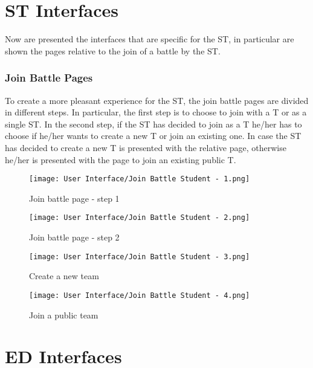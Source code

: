 \newpage

\section*{ST Interfaces}
\label{s:ST_interface}%

Now are presented the interfaces that are specific for the ST, in particular are shown the pages relative to the join of a battle by the ST.

\subsubsection*{Join Battle Pages}
\label{ss:join_battle_pages}%
To create a more pleasant experience for the ST, the join battle pages are divided in different steps. In particular, the first step is to choose to join with a T or as a single ST. In the second step, if the ST has decided to join as a T he/her has to choose if he/her wants to create a new T or join an existing one. In case the ST has decided to create a new T is presented with the relative page, otherwise he/her is presented with the page to join an existing public T.

\begin{figure}[H]
  \centering
  \texttt{[image: User Interface/Join Battle Student - 1.png]}
  \caption{Join battle page - step 1}
  \label{fig:join_battle1}
\end{figure}

\begin{figure}[H]
  \centering
  \texttt{[image: User Interface/Join Battle Student - 2.png]}
  \caption{Join battle page - step 2}
  \label{fig:join_battle2}
\end{figure}

\begin{figure}[H]
  \centering
  \texttt{[image: User Interface/Join Battle Student - 3.png]}
  \caption{Create a new team}
  \label{fig:join_battle3}
\end{figure}

\begin{figure}[H]
  \centering
  \texttt{[image: User Interface/Join Battle Student - 4.png]}
  \caption{Join a public team}
  \label{fig:join_battle4}
\end{figure}

\newpage

\section*{ED Interfaces}
\label{s:ED_interface}%

